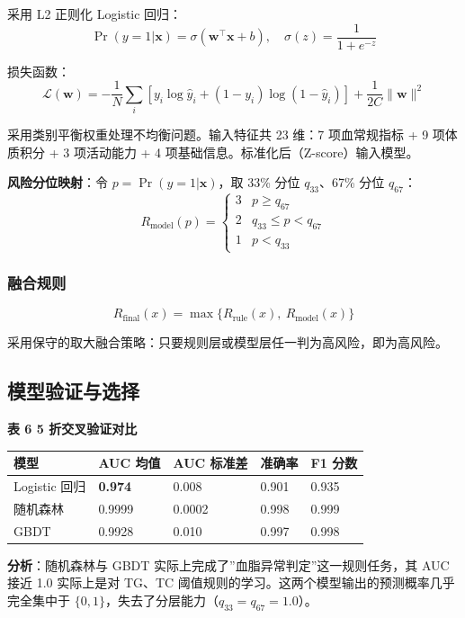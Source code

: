 \documentclass{MathorCupmodeling}
\begin{document}
采用 L2 正则化 Logistic 回归： \[\Pr(y = 1 | \mathbf{x}) = \sigma\left(\mathbf{w}^\top \mathbf{x} + b\right), \quad \sigma(z) = \frac{1}{1 + e^{-z}}\]

损失函数： \[\mathcal{L}(\mathbf{w}) = -\frac{1}{N}\sum_i \left[y_i \log \hat{y}_i + (1 - y_i)\log(1 - \hat{y}_i)\right] + \frac{1}{2C}\|\mathbf{w}\|^2\]

采用类别平衡权重处理不均衡问题。输入特征共 23 维：7 项血常规指标 + 9 项体质积分 + 3 项活动能力 + 4 项基础信息。标准化后（Z-score）输入模型。

\textbf{风险分位映射}：令 \(p = \Pr(y = 1 | \mathbf{x})\)，取 33\% 分位 \(q_{33}\)、67\% 分位 \(q_{67}\)： \[R_{\text{model}}(p) = \begin{cases}3 & p \ge q_{67} \\ 2 & q_{33} \le p < q_{67} \\ 1 & p < q_{33}\end{cases}\]

\subsubsection{融合规则}\label{ux878dux5408ux89c4ux5219}

\[R_{\text{final}}(x) = \max\{R_{\text{rule}}(x),\ R_{\text{model}}(x)\}\]

采用保守的取大融合策略：只要规则层或模型层任一判为高风险，即为高风险。

\subsection{模型验证与选择}\label{ux6a21ux578bux9a8cux8bc1ux4e0eux9009ux62e9}

\textbf{表 6 5 折交叉验证对比}

\begin{longtable}[]{@{}lllll@{}}
\toprule\noalign{}
模型 & AUC 均值 & AUC 标准差 & 准确率 & F1 分数 \\
\midrule\noalign{}
\endhead
\bottomrule\noalign{}
\endlastfoot
Logistic 回归 & \textbf{0.974} & 0.008 & 0.901 & 0.935 \\
随机森林 & 0.9999 & 0.0002 & 0.998 & 0.999 \\
GBDT & 0.9928 & 0.010 & 0.997 & 0.998 \\
\end{longtable}

\textbf{分析}：随机森林与 GBDT 实际上完成了''血脂异常判定''这一规则任务，其 AUC 接近 1.0 实际上是对 TG、TC 阈值规则的学习。这两个模型输出的预测概率几乎完全集中于 \(\{0, 1\}\)，失去了分层能力（\(q_{33} = q_{67} = 1.0\)）。
\end{document}
